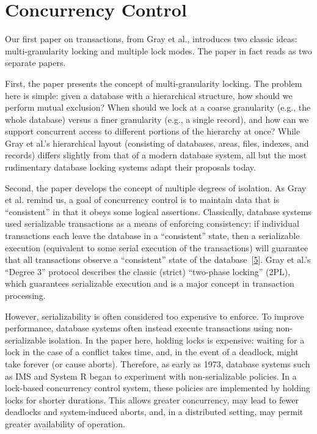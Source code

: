 \documentclass[b5paper,11pt,twoside,openright]{book}
\newcommand\Section[2]{
  \hypertarget{#1}{
    \section{#2}
  }
}
\begin{document}
\Section{concurrency-control}{%
Concurrency Control
}

Our first paper on transactions, from Gray et al., introduces two
classic ideas: multi-granularity locking and multiple lock modes. The
paper in fact reads as two separate papers.

First, the paper presents the concept of multi-granularity locking. The
problem here is simple: given a database with a hierarchical structure,
how should we perform mutual exclusion? When should we lock at a coarse
granularity (e.g., the whole database) versus a finer granularity (e.g.,
a single record), and how can we support concurrent access to different
portions of the hierarchy at once? While Gray et al.'s hierarchical
layout (consisting of databases, areas, files, indexes, and records)
differs slightly from that of a modern database system, all but the most
rudimentary database locking systems adapt their proposals today.

Second, the paper develops the concept of multiple degrees of isolation.
As Gray et al. remind us, a goal of concurrency control is to maintain
data that is ``consistent'' in that it obeys some logical assertions.
Classically, database systems used serializable transactions as a means
of enforcing consistency: if individual transactions each leave the
database in a ``consistent'' state, then a serializable execution
(equivalent to some serial execution of the transactions) will guarantee
that all transactions observe a ``consistent'' state of the
database~{{[}\protect\hyperlink{ref-eswaran76}{5}{]}}. Gray et al.'s
``Degree 3'' protocol describes the classic (strict) ``two-phase
locking'' (2PL), which guarantees serializable execution and is a major
concept in transaction processing.

However, serializability is often considered too expensive to enforce.
To improve performance, database systems often instead execute
transactions using non-serializable isolation. In the paper here,
holding locks is expensive: waiting for a lock in the case of a conflict
takes time, and, in the event of a deadlock, might take forever (or
cause aborts). Therefore, as early as 1973, database systems such as IMS
and System R began to experiment with non-serializable policies. In a
lock-based concurrency control system, these policies are implemented by
holding locks for shorter durations. This allows greater concurrency,
may lead to fewer deadlocks and system-induced aborts, and, in a
distributed setting, may permit greater availability of operation.
\end{document}
